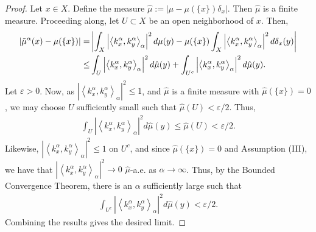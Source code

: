 \documentclass{amsart}
\theoremstyle{definition}
\theoremstyle{remark}
\numberwithin{equation}{section}
\newcommand{\ip}[2]{\left\langle {#1} , {#2} \right\rangle} %
\begin{document}
\begin{proof}


Let $x\in X$. Define the measure $\hat{\mu}:=|\mu-\mu(\{x\})\delta_{x}|$. Then $\hat{\mu}$ is a finite measure. Proceeding along, let $U\subset X$ be an open neighborhood of $x$. Then, 
    \begin{align*}
        \left|\Tilde{\mu}^{\alpha}(x)-\mu(\{x\})\right|=&\left|\int_{X}\left|\ip{k_{x}^{\alpha}}{k_{y}^{\alpha}}_{\alpha}\right|^{2}d\mu(y)-\mu(\{x\})\int_{X}\left|\ip{k_{x}^{\alpha}}{k_{y}^{\alpha}}_{\alpha}\right|^{2}d\delta_{x}(y)\right|\\
        \leq&\int_{U}\left|\ip{k_{x}^{\alpha}}{k_{y}^{\alpha}}_{\alpha}\right|^{2}d\hat{\mu}(y)+\int_{U^{c}}\left|\ip{k_{x}^{\alpha}}{k_{y}^{\alpha}}_{\alpha}\right|^{2}d\hat{\mu}(y).
    \end{align*}
    Let $\varepsilon>0$. Now, as $\left|\ip{k_{x}^{\alpha}}{k_{y}^{\alpha}}_{\alpha}\right|^{2}\leq 1$, and $\hat{\mu}$ is a finite measure with $\hat{\mu}(\{x\})=0$, we may choose $U$ sufficiently small such that $\hat{\mu}(U)<\varepsilon/2$. Thus, 
    \begin{align*}
        \int_{U}\left|\ip{k_{x}^{\alpha}}{k_{y}^{\alpha}}_{\alpha}\right|^{2}d\hat{\mu}(y)\leq\hat{\mu}(U)<\varepsilon/2.
    \end{align*}
    Likewise, $\left|\ip{k_{x}^{\alpha}}{k_{y}^{\alpha}}_{\alpha}\right|^{2}\leq 1$ on $U^{c}$, and since $\hat{\mu}(\{x\})=0$ and Assumption (III), we have that $\left|\ip{k_{x}^{\alpha}}{k_{y}^{\alpha}}_{\alpha}\right|^{2}\to 0$ $\hat{\mu}$-a.e. as $\alpha\to\infty$. Thus, by the Bounded Convergence Theorem, there is an $\alpha$ sufficiently large such that 
    \begin{align*}
        \int_{U^{c}}\left|\ip{k_{x}^{\alpha}}{k_{y}^{\alpha}}_{\alpha}\right|^{2}d\hat{\mu}(y)<\varepsilon/2.
    \end{align*}
    Combining the results gives the desired limit. 
\end{proof}
\end{document}
